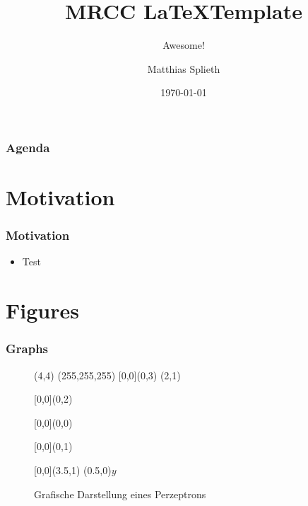 \documentclass{beamer}
\title{MRCC \LaTeX Template}
\subtitle{Awesome!}
\date{\today}
\author{Matthias Splieth}
\begin{document}
\begin{frame}[plain]
	\titlepage
\end{frame}

\section[Agenda]{}
\begin{frame}
\frametitle{Agenda}
	\tableofcontents
\end{frame}


\section{Motivation}
\begin{frame}
\frametitle{Motivation}
	\begin{itemize}
		\item Test
	\end{itemize}
\end{frame}


\section{Figures}
\begin{frame}
\frametitle{Graphs}
	\begin{figure}
	\begin{center}
			\begin{graph}(4,4)
				\fillednodestrue
				\graphnodecolour(255,255,255)
		[0,0](0,3)
		(2,1)
		
		[0,0](0,2)
		
		[0,0](0,0)
		
		[0,0](0,1)
		
		[0,0](3.5,1)
		(0.5,0){$y$}
		
	\end{graph}
	\end{center}
	\caption{Grafische Darstellung eines Perzeptrons}
	\label{figerzeptron}
	\end{figure}	
\end{frame}
\end{document}
